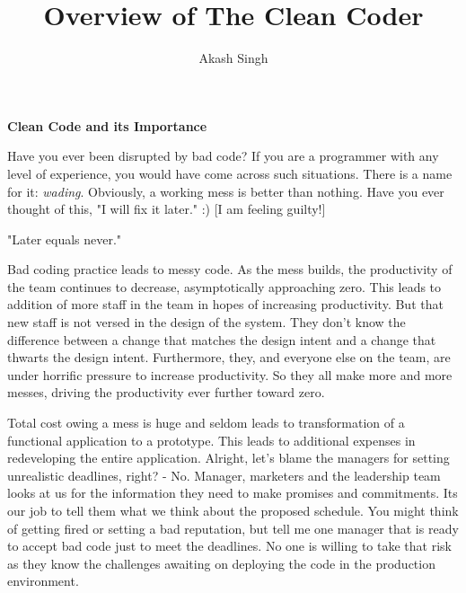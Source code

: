 \documentclass[12pt]{article}
\title{Overview of The Clean Coder}
\author{Akash Singh}
\affil{School of Computer Science, McGill University, Montreal, Canada}
\date{}
\begin{document}
\maketitle
{\Large \textbf{Clean Code and its Importance}\par}


Have you ever been disrupted by bad code? If you are a programmer with any level of experience, you would have come across such situations. There is a name for it: \textit{wading}. Obviously, a working mess is better than nothing. Have you ever thought of this, "I will fix it later." :) [I am feeling guilty!]

"Later equals never."

Bad coding practice leads to messy code. As the mess builds, the productivity of the team continues to decrease, asymptotically approaching zero. This leads to addition of more staff in the team in hopes of increasing productivity. But that new staff is not versed in the design of the system. They don’t know the difference between a change that matches the design intent and a change that thwarts the design intent. Furthermore, they, and everyone else on the team, are under horrific pressure to increase productivity. So they all make more and more messes, driving the productivity ever further toward zero.

Total cost owing a mess is huge and seldom leads to transformation of a functional application to a prototype. This leads to additional expenses in redeveloping the entire application. Alright, let's blame the managers for setting unrealistic deadlines, right? - No. Manager, marketers and the leadership team looks at us for the information they need to make promises and commitments. Its our job to tell them what we think about the proposed schedule. You might think of getting fired or setting a bad reputation, but tell me one manager that is ready to accept bad code just to meet the deadlines. No one is willing to take that risk as they know the challenges awaiting on deploying the code in the production environment. 
\end{document}
